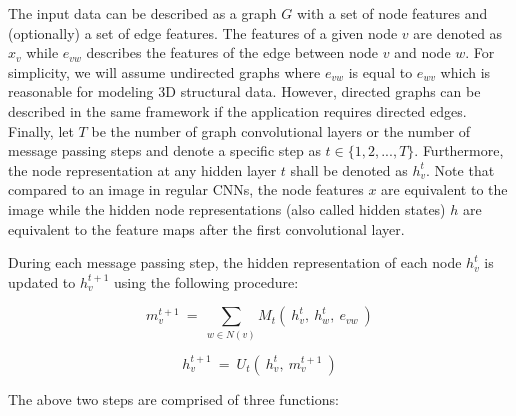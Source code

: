 The input data can be described as a graph $G$ with	a set of node features and (optionally) a set of edge features. The features of a given node $v$ are denoted as $x_v$ while $e_{vw}$ describes the features of the edge between node $v$ and node $w$. For simplicity, we will assume undirected graphs where $e_{vw}$ is equal to $e_{wv}$ which is reasonable for modeling 3D structural data. However, directed graphs can be described in the same framework if the application requires directed edges. Finally, let $T$ be the number of graph convolutional layers or the number of message passing steps and denote a specific step as $t \in \{1, 2, ..., T\}$. Furthermore, the node representation at any hidden layer $t$ shall be denoted as $h_v^t$. Note that compared to an image in regular CNNs, the node features $x$ are equivalent to the image while the hidden node representations (also called hidden states) $h$ are equivalent to the feature maps after the first convolutional layer.

During each message passing step, the hidden representation of each node $h_v^t$ is updated to $h_v^{t+1}$ using the following procedure:

\begin{equation}\label{eq:message-function}
m_v^{t+1} ~=~ \sum_{w \in N(v)} M_t(~h_v^t,~ h_w^t,~ e_{vw}~)
\end{equation}

\begin{equation}\label{eq:update-function}
h_v^{t+1} ~=~ U_t(~h_v^t, ~m_v^{t+1}~)
\end{equation}


The above two steps are comprised of three functions:

